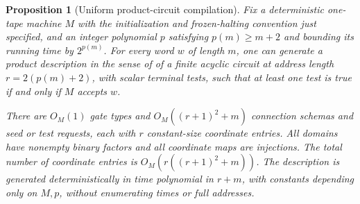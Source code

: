 \documentclass[11pt]{article}
\newtheorem{proposition}[theorem]{Proposition}
\theoremstyle{definition}
\begin{document}
\begin{proposition}[Uniform product-circuit compilation]\label{prop:computation}
Fix a deterministic one-tape machine \(M\) with the initialization and
frozen-halting convention just specified, and an integer polynomial \(p\)
satisfying \(p(m)\ge m+2\) and bounding its running time by \(2^{p(m)}\).
For every word \(w\) of length \(m\), one can generate a product description
in the sense of  of a finite acyclic circuit
at address length \(r=2(p(m)+2)\), with scalar terminal tests, such that
at least one test is true if and only if \(M\) accepts \(w\).

There are \(O_M(1)\) gate types and \(O_M((r+1)^2+m)\) connection
schemas and seed or test requests, each with \(r\) constant-size
coordinate entries. All domains have nonempty binary factors and all
coordinate maps are injections. The total number of coordinate entries
is \(O_M(r((r+1)^2+m))\). The description is generated deterministically
in time polynomial in \(r+m\), with constants depending only on \(M,p\),
without enumerating times or full addresses.
\end{proposition}
\end{document}
